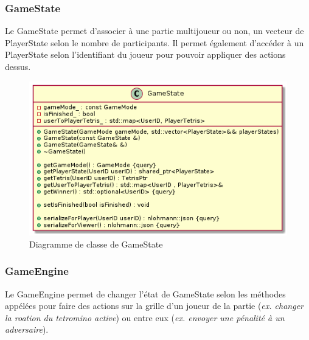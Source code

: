 \documentclass{article}
\begin{document}
\subsubsection*{GameState}

Le GameState permet d'associer à une partie multijoueur ou non, un vecteur de PlayerState selon le nombre de participants. Il permet également d'accéder à un PlayerState selon l'identifiant du joueur pour pouvoir appliquer des actions dessus.

\begin{figure}[!h]
	\centering
	 \includegraphics[scale=0.6]{../../res/uml/class/GameStateClass.png}
	 \caption{Diagramme de classe de GameState}
	 \label{fig:GameStateDiagram}
\end{figure}


\subsubsection*{GameEngine}

Le GameEngine permet de changer l'état de GameState selon les méthodes appélées pour faire des actions sur la grille d'un joueur de la partie (\textit{ex. changer la roation du tetromino active}) ou entre eux (\textit{ex. envoyer une pénalité à un adversaire}). 
\end{document}
